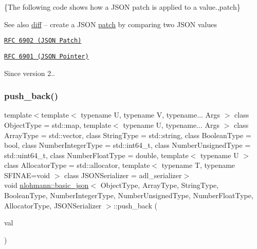 \{The following code shows how a J\+S\+ON patch is applied to a value.,patch\}

\begin{DoxySeeAlso}{See also}
\mbox{\hyperlink{classnlohmann_1_1basic__json_a543bd5f7490de54c875b2c0912dc9a49}{diff}} -- create a J\+S\+ON \mbox{\hyperlink{classnlohmann_1_1basic__json_a81e0c41a4a9dff4df2f6973f7f8b2a83}{patch}} by comparing two J\+S\+ON values

\href{https://tools.ietf.org/html/rfc6902}{\tt R\+FC 6902 (J\+S\+ON Patch)} 

\href{https://tools.ietf.org/html/rfc6901}{\tt R\+FC 6901 (J\+S\+ON Pointer)}
\end{DoxySeeAlso}
\begin{DoxySince}{Since}
version 2.. 
\end{DoxySince}
\mbox{\label{classnlohmann_1_1basic__json_ac8e523ddc8c2dd7e5d2daf0d49a9c0d7}} 
\subsubsection{\texorpdfstring{push\+\_\+back()}{push\_back()}\hspace{0.1cm}{\footnotesize\ttfamily [1/4]}}
{\footnotesize\ttfamily template$<$template$<$ typename U, typename V, typename... Args $>$ class Object\+Type = std\+::map, template$<$ typename U, typename... Args $>$ class Array\+Type = std\+::vector, class String\+Type  = std\+::string, class Boolean\+Type  = bool, class Number\+Integer\+Type  = std\+::int64\+\_\+t, class Number\+Unsigned\+Type  = std\+::uint64\+\_\+t, class Number\+Float\+Type  = double, template$<$ typename U $>$ class Allocator\+Type = std\+::allocator, template$<$ typename T, typename S\+F\+I\+N\+A\+E=void $>$ class J\+S\+O\+N\+Serializer = adl\+\_\+serializer$>$ \\
void \mbox{\hyperlink{classnlohmann_1_1basic__json}{nlohmann\+::basic\+\_\+json}}$<$ Object\+Type, Array\+Type, String\+Type, Boolean\+Type, Number\+Integer\+Type, Number\+Unsigned\+Type, Number\+Float\+Type, Allocator\+Type, J\+S\+O\+N\+Serializer $>$\+::push\+\_\+back (\begin{DoxyParamCaption}\item[{\mbox{\hyperlink{classnlohmann_1_1basic__json}{basic\+\_\+json}}$<$ Object\+Type, Array\+Type, String\+Type, Boolean\+Type, Number\+Integer\+Type, Number\+Unsigned\+Type, Number\+Float\+Type, Allocator\+Type, J\+S\+O\+N\+Serializer $>$ \&\&}]{val }\end{DoxyParamCaption})\hspace{0.3cm}{\ttfamily [inline]}}




